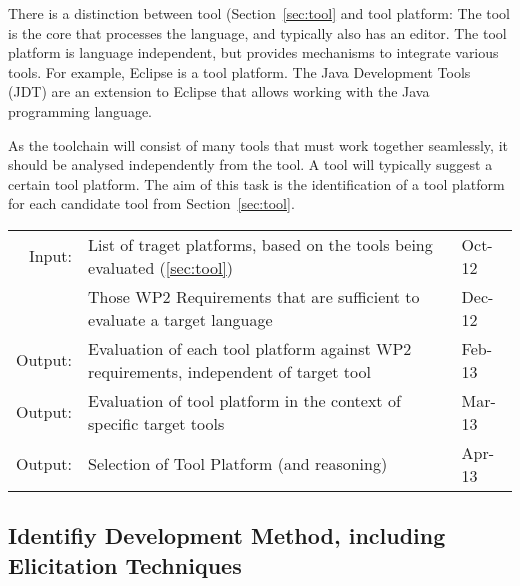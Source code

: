 \documentclass[11pt, a4paper]{article}
\newenvironment{inoutput}
{\vspace{2mm}
\noindent
\begin{tabular}{|r|p{.7\linewidth}|l|}
\hline}
{
\hline
\end{tabular}}
\begin{document}
There is a distinction between tool (Section~\ref{sec:tool} and tool platform: The tool is the core that processes the language, and typically also has an editor.  The tool platform is language independent, but provides mechanisms to integrate various tools.  For example, Eclipse is a tool platform.  The Java Development Tools (JDT) are an extension to Eclipse that allows working with the Java programming language.

As the toolchain will consist of many tools that must work together seamlessly, it should be analysed independently from the tool.  A tool will typically suggest a certain tool platform.  The aim of this task is the identification of a tool platform for each candidate tool from Section~\ref{sec:tool}.


\begin{inoutput}
Input: & List of traget platforms, based on the tools being evaluated (\ref{sec:tool}) & Oct-12 \\
& Those WP2 Requirements that are sufficient to evaluate a target language & Dec-12 \\
\hline
Output: & Evaluation of each tool platform against WP2 requirements, independent of target tool & Feb-13 \\
Output: & Evaluation of tool platform in the context of specific target tools & Mar-13 \\
Output: & Selection of Tool Platform (and reasoning) & Apr-13 \\
\end{inoutput}

\subsection{Identifiy Development Method, including Elicitation Techniques}
\end{document}
